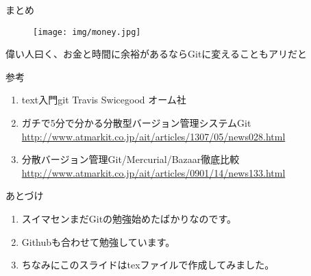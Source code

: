 \documentclass[dvipdfmx]{beamer}
\begin{document}
\begin{frame}{まとめ}
\begin{center}
\begin{figure}
\texttt{[image: img/money.jpg]}
\end{figure}
\end{center}
\vspace{5cm}
\color{white}\huge{偉い人曰く、お金と時間に余裕があるならGitに変えることもアリだと}
\end{frame}

\begin{frame}{参考}
\begin{enumerate}
\item {text}入門git Travis Swicegood オーム社
\item ガチで5分で分かる分散型バージョン管理システムGit \\ \href{http://www.atmarkit.co.jp/ait/articles/1307/05/news028.html}
{http://www.atmarkit.co.jp/ait/articles/1307/05/news028.html}

\item 分散バージョン管理Git/Mercurial/Bazaar徹底比較 \\
\href{http://www.atmarkit.co.jp/ait/articles/0901/14/news133.html}
{http://www.atmarkit.co.jp/ait/articles/0901/14/news133.html}
\end{enumerate}
\end{frame}

\begin{frame}{あとづけ}
\begin{enumerate}
\item スイマセンまだGitの勉強始めたばかりなのです。
\item Githubも合わせて勉強しています。
\item ちなみにこのスライドはtexファイルで作成してみました。
\end{enumerate}
\end{frame}
\end{document}
